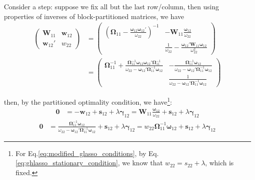 \documentclass[twoside]{article}
\begin{document}
Consider a  step: suppose we fix all but the last row/column, then using properties of inverses of block-partitioned matrices, we have 
\begin{align*}
    \begin{pmatrix}
        \mathbf{W}_{11} & \mathbf{w}_{12}\\
        \mathbf{w}_{12}' & w_{22}
     \end{pmatrix} &= \begin{pmatrix}
        \left( \boldsymbol{\Omega}_{11}-\frac{\boldsymbol{\omega}_{12}\boldsymbol{\omega}_{12}'}{\omega_{22}} \right)^{-1} & -\mathbf{W}_{11}\frac{\boldsymbol{\omega}_{12}}{\omega_{22}}\\
         & \frac{1}{\omega_{22}}-\frac{\boldsymbol{\omega}_{12}'\mathbf{W}_{11}\boldsymbol{\omega}_{12}}{\omega^2_{22}}
     \end{pmatrix}\\
     &= \begin{pmatrix}
        \boldsymbol{\Omega}^{-1}_{11}+\frac{\boldsymbol{\Omega}^{-1}_{11}\boldsymbol{\omega}_{12}\boldsymbol{\omega}_{12}'\boldsymbol{\Omega}^{-1}_{11}}{\omega_{22}-\boldsymbol{\omega}_{12}'\boldsymbol{\Omega}^{-1}_{11}\boldsymbol{\omega}_{12}} & -\frac{\boldsymbol{\Omega}^{-1}_{11}\boldsymbol{\omega}_{12}}{\omega_{22}-\boldsymbol{\omega}_{12}'\boldsymbol{\Omega}^{-1}_{11}\boldsymbol{\omega}_{12}} \\
        & \frac{1}{\omega_{22}-\boldsymbol{\omega}_{12}'\boldsymbol{\Omega}^{-1}_{11}\boldsymbol{\omega}_{12}}
     \end{pmatrix}
\end{align*}

then, by the partitioned optimality condition, we have\footnote{For Eq.\ref{eq:modified_glasso_conditions}, by Eq.\ref{eq:ghlasso_stationary_condition}, we know that $w_{22}=s_{22}+\lambda$, which is fixed.}:
\begin{align}\label{eq:glasso_conditions}
    \mathbf{0} &= -\mathbf{w}_{12} + \mathbf{s}_{12}+\lambda \boldsymbol{\gamma}_{12} = \mathbf{W}_{11}\frac{\boldsymbol{\omega}_{12}}{\omega_{22}}+ \mathbf{s}_{12}+\lambda \boldsymbol{\gamma}_{12}
\end{align}
\begin{align}\label{eq:modified_glasso_conditions}
    \mathbf{0} &= \frac{\boldsymbol{\Omega}^{-1}_{11}\boldsymbol{\omega}_{12}}{\omega_{22}-\boldsymbol{\omega}_{12}'\boldsymbol{\Omega}^{-1}_{11}\boldsymbol{\omega}_{12}} + \mathbf{s}_{12} + \lambda\boldsymbol{\gamma}_{12} = w_{22}\boldsymbol{\Omega}^{-1}_{11}\boldsymbol{\omega}_{12} + \mathbf{s}_{12} + \lambda\boldsymbol{\gamma}_{12}
\end{align}
\end{document}
